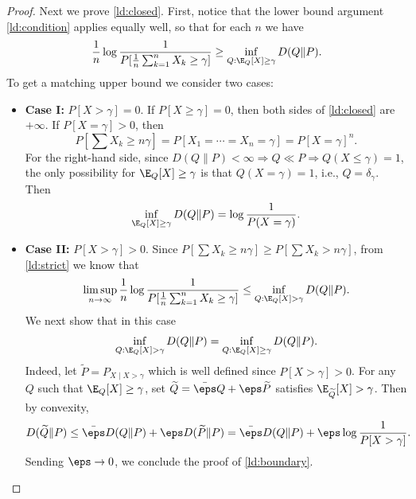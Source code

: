 \begin{proof}
Next we prove \eqref{ld:closed}. First, notice that the lower bound argument \eqref{ld:condition} applies equally well, so that for each $n$ we have
\[
\frac1n\log\frac1{P[\frac1n\sum_{k=1}^nX_k\ge\gamma]}
\ge\inf_{Q:\E_Q[X]\ge\gamma}D(Q\|P).
\]
To get a matching upper bound we consider two cases:
\begin{itemize}
\item \textbf{Case I:} $P[X>\gamma]=0$. If $P[X\ge\gamma]=0$, then both sides of \eqref{ld:closed} are $+\infty$. If $P[X=\gamma]>0$, then
\[
P\left[\sum X_k\ge n\gamma\right]
=P[X_1=\cdots=X_n=\gamma]=P[X=\gamma]^n.
\]
For the right-hand side, since $D(Q\|P)<\infty\Rightarrow Q\ll P\Rightarrow Q(X\le\gamma)=1$, the only possibility for $\E_Q[X]\ge\gamma$ is that $Q(X=\gamma)=1$, i.e., $Q=\delta_\gamma$. Then
\[
\inf_{\E_Q[X]\ge\gamma}D(Q\|P)=\log\frac1{P(X=\gamma)}.
\]
\item \textbf{Case II:} $P[X>\gamma]>0$. Since $P[\sum X_k\ge n\gamma]\ge P[\sum X_k>n\gamma]$, from \eqref{ld:strict} we know that
\[
\limsup_{n\to\infty}\frac1n\log\frac1{P[\frac1n\sum_{k=1}^nX_k\ge\gamma]}
\le\inf_{Q:\E_Q[X]>\gamma}D(Q\|P).
\]
We next show that in this case
\begin{equation}\label{ld:boundary}
\inf_{Q:\E_Q[X]>\gamma}D(Q\|P)=\inf_{Q:\E_Q[X]\ge\gamma}D(Q\|P).
\end{equation}
Indeed, let $\widetilde P=P_{X\mid X>\gamma}$ which is well defined since $P[X>\gamma]>0$. For any $Q$ such that $\E_Q[X]\ge\gamma$, set $\widetilde Q=\bar\eps Q+\eps\widetilde P$ satisfies $\E_{\widetilde Q}[X]>\gamma$. Then by convexity,
\[
D(\widetilde Q\|P)\le\bar\eps D(Q\|P)+\eps D(\widetilde P\|P)
=\bar\eps D(Q\|P)+\eps\log\frac1{P[X>\gamma]}.
\]
Sending $\eps\to0$, we conclude the proof of \eqref{ld:boundary}.
\end{itemize}
\end{proof}
